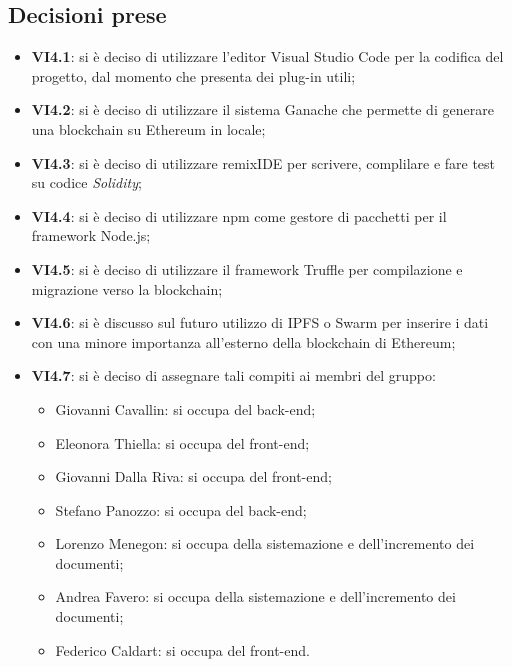 	\subsection{Decisioni prese}
		\begin{itemize}
			\item \textbf{VI4.1}: si è deciso di utilizzare l'editor Visual Studio Code per la codifica del progetto, dal momento che presenta dei plug-in utili;
			\item \textbf{VI4.2}: si è deciso di utilizzare il sistema Ganache che permette di generare una blockchain su Ethereum in locale;
			\item \textbf{VI4.3}: si è deciso di utilizzare remixIDE per scrivere, complilare e fare test su codice \emph{Solidity};
			\item \textbf{VI4.4}: si è deciso di utilizzare npm come gestore di pacchetti per il framework Node.js;
			\item \textbf{VI4.5}: si è deciso di utilizzare il framework Truffle per compilazione e migrazione verso la blockchain;
			\item \textbf{VI4.6}: si è discusso sul futuro utilizzo di IPFS o Swarm per inserire i dati con una minore importanza all'esterno della blockchain di Ethereum;
			\item \textbf{VI4.7}: si è deciso di assegnare tali compiti ai membri del gruppo:
				\begin{itemize}
					\item Giovanni Cavallin: si occupa del back-end;
					\item Eleonora Thiella: si occupa del front-end;
					\item Giovanni Dalla Riva: si occupa del front-end;
					\item Stefano Panozzo: si occupa del back-end;
					\item Lorenzo Menegon: si occupa della sistemazione e dell'incremento dei documenti;
					\item Andrea Favero: si occupa della sistemazione e dell'incremento dei documenti;
					\item Federico Caldart: si occupa del front-end.
				\end{itemize}
		\end{itemize}

